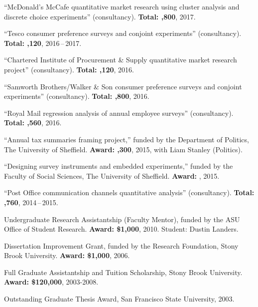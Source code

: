\documentclass[12pt]{article}
\begin{document}
\begin{bibsection}

	\item ``McDonald's McCafe quantitative market research using 
	cluster analysis and discrete choice experiments'' (consultancy). 
	\textbf{Total: ,800}, 2017.

	\item ``Tesco consumer preference surveys and conjoint experiments'' (consultancy). 
	\textbf{Total: ,120}, 2016\,--\,2017.

	\item ``Chartered Institute of Procurement \& Supply quantitative market research project'' 
	(consultancy). \textbf{Total: ,120}, 2016.

	\item ``Samworth Brothers/Walker \& Son consumer preference surveys and conjoint experiments'' (consultancy). 
	\textbf{Total: ,800}, 2016.

	\item ``Royal Mail regression analysis of annual employee surveys'' (consultancy).
	\textbf{Total: ,560}, 2016.

	\item ``Annual tax summaries framing project,'' funded by the Department of Politics, 
	The University of Sheffield.  \textbf{Award: ,300}, 2015, 
	 with Liam Stanley (Politics).
	 
	\item ``Designing survey instruments and embedded experiments,'' 
	funded by the Faculty of Social Sciences, The University of Sheffield. 
	\textbf{Award: }, 2015.
	
	\item ``Post Office communication channels quantitative analysis'' (consultancy). 
	\textbf{Total: ,760}, 2014\,--\,2015.
    
    \item Undergraduate Research Assistantship (Faculty Mentor), funded by the ASU Office of Student Research. \textbf{Award: \$1,000}, 2010. Student: Dustin Landers.

	\item Dissertation Improvement Grant, funded by the Research Foundation, Stony Brook University. \textbf{Award: \$1,000}, 2006.

	\item Full Graduate Assistantship and Tuition Scholarship, Stony Brook University.
	\textbf{Award: \$120,000}, 2003-2008.

	\item Outstanding Graduate Thesis Award, San Francisco State University, 2003.

\end{bibsection}
\end{document}
